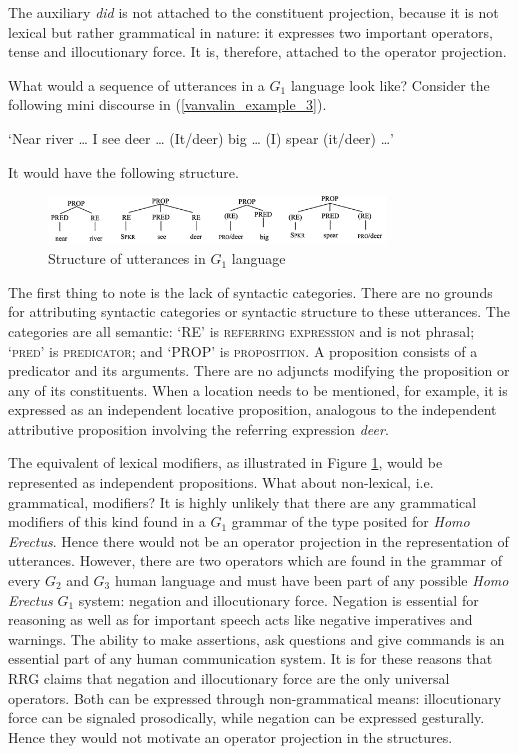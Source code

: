 \documentclass[output=paper,colorlinks,citecolor=brown]{langscibook}
\begin{document}
The auxiliary \emph{did} is not attached to the constituent projection, because it is not lexical but  rather grammatical in nature: it expresses two important operators, tense and illocutionary force.  It is, therefore, attached to the operator projection.

What would a sequence of utterances in a $G_1$ language look like?  Consider the following mini discourse in (\ref{vanvalin_example_3}).

\ea \label{vanvalin_example_3}
‘Near river \ldots{}  I see deer \ldots{}  (It/deer) big \ldots{}  (I) spear (it/deer) \ldots ’\z

It would have the following structure.
\begin{figure}
\centering
\includegraphics[width=0.8\textwidth]{vanvalin_figure2.png}
\caption{\label{fig:fig2}Structure of utterances in $G_1$ language}
\end{figure}

The first thing to note is the lack of syntactic categories.  There are no grounds for attributing syntactic categories or syntactic structure to these utterances.  The categories are all semantic: ‘RE’ is \textsc{referring expression} and is not phrasal; ‘\textsc{pred}’ is \textsc{predicator}; and ‘PROP’ is \textsc{proposition}.  A proposition consists of a predicator and its arguments. There are no adjuncts modifying the proposition or any of its constituents.  When a location needs to be mentioned, for example, it is expressed as an independent locative proposition, analogous to the independent attributive proposition involving the referring expression \emph{deer}.  

The equivalent of lexical modifiers, as illustrated in Figure \ref{fig:fig2}, would be represented as independent propositions.  What about non-lexical, i.e. grammatical, modifiers?  It is highly unlikely that there are any grammatical modifiers of this kind found in a $G_1$ grammar of the type posited for \emph{Homo Erectus}.  Hence there would not be an operator projection in the representation of utterances.  However, there are two operators which are found in the grammar of every $G_2$ and $G_3$ human language and must have been part of any possible \emph{Homo Erectus} $G_1$ system: negation and illocutionary force. Negation is essential for reasoning as well as for important speech acts like negative imperatives and warnings.  The ability to make assertions, ask questions and give commands is an essential part of any human communication system.  It is for these reasons that RRG claims that negation and illocutionary force are the only universal operators.  Both can be expressed through non-grammatical means: illocutionary force can be signaled prosodically, while negation can be expressed gesturally.  Hence they would not motivate an operator projection in the structures.
\end{document}
